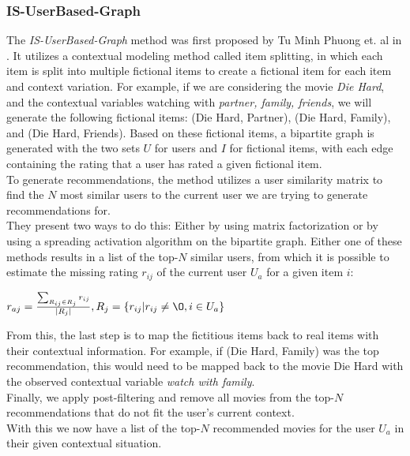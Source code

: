 \subsubsection{IS-UserBased-Graph}
The \textit{IS-UserBased-Graph} method was first proposed by Tu Minh Phuong et. al in \cite{GraphBasedCollaborativePaper}.
It utilizes a contextual modeling method called item splitting, in which each item is split into multiple fictional items to create a fictional item for each item and context variation.
For example, if we are considering the movie \textit{Die Hard}, and the contextual variables watching with \textit{partner, family, friends}, we will generate the following fictional items: (Die Hard, Partner), (Die Hard, Family), and (Die Hard, Friends).
Based on these fictional items, a bipartite graph is generated with the two sets $U$ for users and $I$ for fictional items, with each edge containing the rating that a user has rated a given fictional item.\\
To generate recommendations, the method utilizes a user similarity matrix to find the $N$ most similar users to the current user we are trying to generate recommendations for.\\
They present two ways to do this: Either by using matrix factorization or by using a spreading activation algorithm on the bipartite graph.
Either one of these methods results in a list of the top-$N$ similar users, from which it is possible to estimate the missing rating $r_{ij}$ of the current user $U_a$ for a given item $i$:

$r_{aj} = \frac{\sum_{R_{ij} \in R_j} r_{ij}}{|R_j|}, R_j = \{ r_{ij} | r_{ij} \neq \O , i \in U_a \}$

From this, the last step is to map the fictitious items back to real items with their contextual information.
For example, if (Die Hard, Family) was the top recommendation, this would need to be mapped back to the movie Die Hard with the observed contextual variable \textit{watch with family}.\\
Finally, we apply post-filtering and remove all movies from the top-$N$ recommendations that do not fit the user's current context.\\
With this we now have a list of the top-$N$ recommended movies for the user $U_a$ in their given contextual situation.
